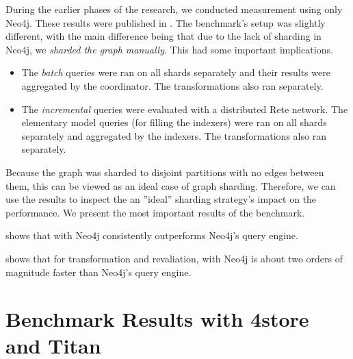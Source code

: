 During the earlier phases of the research, we conducted measurement using only Neo4j. These results were published in \cite{Izso:2012:ODD:2428516.2428523}. The benchmark's setup was slightly different, with the main difference being that due to the lack of sharding in Neo4j, we \emph{sharded the graph manually}. This had some important implications.
  \begin{itemize}
    \item The \emph{batch} queries were ran on all shards separately and their results were aggregated by the coordinator. The transformations also ran separately. 
    \item The \emph{incremental} queries were evaluated with a distributed Rete network. The elementary model queries (for filling the indexers) were ran on all shards separately and aggregated by the indexers. The transformations also ran separately.

  \end{itemize}

Because the graph was sharded to disjoint partitions with no edges between them, this can be viewed as an ideal case of graph sharding. Therefore, we can use the results to inspect the an ''ideal'' sharding strategy's impact on the performance. We present the most important results of the benchmark.


 shows that \iqd{} with Neo4j consistently outperforms Neo4j's query engine.


 shows that for transformation and revaliation, \iqd{} with Neo4j is about two orders of magnitude faster than Neo4j's query engine.


\section{Benchmark Results with 4store and Titan}
\label{evaluation-results}

